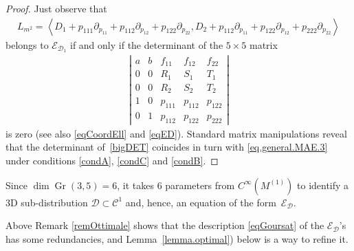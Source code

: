\documentclass[pdftex]{sigma}
\newcommand{\C}{\mathcal{C}}
\newcommand{\D}{\mathcal{D}}
\newcommand{\E}{\mathcal{E}}
\newcommand{\Gr}{\operatorname{Gr}}
\newcommand{\Span}[1]{\left\langle #1 \right\rangle}
\numberwithin{equation}{section}
\begin{document}
\begin{proof}
 Just observe that
\begin{gather*}
L_{m^2}=\Span{ D_1+ p_{111}\partial_{p_{11}}+p_{112}\partial_{p_{12}}+p_{122}\partial_{p_{22}}, D_2 + p_{112}\partial_{p_{11}}+p_{122}\partial_{p_{12}}+p_{222}\partial_{p_{22}} }
\end{gather*}
belongs to $\E_{\D_1}$ if and only if the determinant of the $5\times 5$ matrix
\begin{gather}\label{bigDET}
\left|\begin{matrix}a & b & f_{11} & f_{12} & f_{22} \\0 & 0 & R_1 & S_1 & T_1 \\0 & 0 & R_2 & S_2 & T_2 \\1 & 0 & p_{111} & p_{112} & p_{122} \\0 & 1 & p_{112} & p_{122} & p_{222}\end{matrix}\right|
\end{gather}
is zero (see also \eqref{eqCoordEll} and \eqref{eqED}). Standard matrix manipulations reveal that the determinant of~\eqref{bigDET} coincides in turn with \eqref{eq.general.MAE.3} under conditions \eqref{condA}, \eqref{condC} and \eqref{condB}.
\end{proof}

\begin{Remark}\label{remOttimale}
Since $\dim\Gr(3,5)=6$, it takes 6 parameters from $C^\infty(M^{(1)})$ to identify a 3D sub-distribution $\D\subset\C^1$ and, hence, an equation of the form~$\E_\D$.
\end{Remark}

Above Remark \ref{remOttimale} shows that the description \eqref{eqGoursat} of the $\E_\D$'s has some redundancies, and Lemma~\ref{lemma.optimal}) below
is a way to ref\/ine it.
\end{document}
